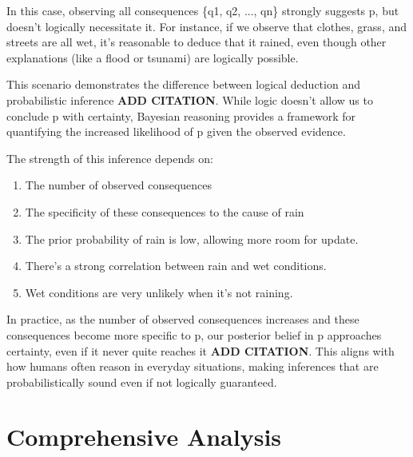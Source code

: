 \documentclass[10pt,letterpaper]{article}
\begin{document}
In this case, observing all consequences \{q1, q2, ..., qn\} strongly suggests p, but doesn't logically necessitate it. For instance, if we observe that clothes, grass, and streets are all wet, it's reasonable to deduce that it rained, even though other explanations (like a flood or tsunami) are logically possible.

This scenario demonstrates the difference between logical deduction and probabilistic inference \textbf{ADD CITATION}. While logic doesn't allow us to conclude p with certainty, Bayesian reasoning provides a framework for quantifying the increased likelihood of p given the observed evidence.

The strength of this inference depends on:

\begin{enumerate}
    \item The number of observed consequences
    \item The specificity of these consequences to the cause of rain
    \item The prior probability of rain is low, allowing more room for update.
    \item There's a strong correlation between rain and wet conditions.
    \item Wet conditions are very unlikely when it's not raining.
\end{enumerate}

In practice, as the number of observed consequences increases and these consequences become more specific to p, our posterior belief in p approaches certainty, even if it never quite reaches it \textbf{ADD CITATION}. This aligns with how humans often reason in everyday situations, making inferences that are probabilistically sound even if not logically guaranteed.

\section{Comprehensive Analysis}

\end{document}
